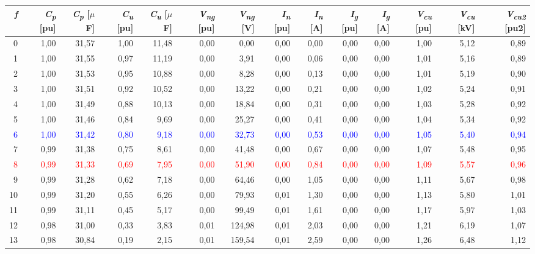 \begin{tabular}{rrrrrrrrrrrrrr}
\toprule
\textit{\textbf{f}} & \textbf{\textit{C\textsubscript{p}} [pu]} & \textbf{\textit{C\textsubscript{p}} [$\mu$F]} & \textbf{\textit{C\textsubscript{u}} [pu]} & \textbf{\textit{C\textsubscript{u}} [$\mu$F]} & \textbf{\textit{V\textsubscript{ng}} [pu]} & \textbf{\textit{V\textsubscript{ng}} [V]} & \textbf{\textit{I\textsubscript{n}} [pu]} & \textbf{\textit{I\textsubscript{n}} [A]} & \textbf{\textit{I\textsubscript{g}} [pu]} & \textbf{\textit{I\textsubscript{g}} [A]} & \textbf{\textit{V\textsubscript{cu}} [pu]} & \textbf{\textit{V\textsubscript{cu}} [kV]} & \textbf{\textit{V\textsubscript{cu2}} [pu2]} \\
\midrule
0 & 1,00 & 31,57 & 1,00 & 11,48 & 0,00 & 0,00 & 0,00 & 0,00 & 0,00 & 0,00 & 1,00 & 5,12 & 0,89 \\
1 & 1,00 & 31,55 & 0,97 & 11,19 & 0,00 & 3,91 & 0,00 & 0,06 & 0,00 & 0,00 & 1,01 & 5,16 & 0,89 \\
2 & 1,00 & 31,53 & 0,95 & 10,88 & 0,00 & 8,28 & 0,00 & 0,13 & 0,00 & 0,00 & 1,01 & 5,19 & 0,90 \\
3 & 1,00 & 31,51 & 0,92 & 10,52 & 0,00 & 13,22 & 0,00 & 0,21 & 0,00 & 0,00 & 1,02 & 5,24 & 0,91 \\
4 & 1,00 & 31,49 & 0,88 & 10,13 & 0,00 & 18,84 & 0,00 & 0,31 & 0,00 & 0,00 & 1,03 & 5,28 & 0,92 \\
5 & 1,00 & 31,46 & 0,84 & 9,69 & 0,00 & 25,27 & 0,00 & 0,41 & 0,00 & 0,00 & 1,04 & 5,34 & 0,92 \\
\textcolor{blue}{6} & \textcolor{blue}{1,00} & \textcolor{blue}{31,42} & \textcolor{blue}{0,80} & \textcolor{blue}{9,18} & \textcolor{blue}{0,00} & \textcolor{blue}{32,73} & \textcolor{blue}{0,00} & \textcolor{blue}{0,53} & \textcolor{blue}{0,00} & \textcolor{blue}{0,00} & \textcolor{blue}{1,05} & \textcolor{blue}{5,40} & \textcolor{blue}{0,94} \\
7 & 0,99 & 31,38 & 0,75 & 8,61 & 0,00 & 41,48 & 0,00 & 0,67 & 0,00 & 0,00 & 1,07 & 5,48 & 0,95 \\
\textcolor{red}{8} & \textcolor{red}{0,99} & \textcolor{red}{31,33} & \textcolor{red}{0,69} & \textcolor{red}{7,95} & \textcolor{red}{0,00} & \textcolor{red}{51,90} & \textcolor{red}{0,00} & \textcolor{red}{0,84} & \textcolor{red}{0,00} & \textcolor{red}{0,00} & \textcolor{red}{1,09} & \textcolor{red}{5,57} & \textcolor{red}{0,96} \\
9 & 0,99 & 31,28 & 0,62 & 7,18 & 0,00 & 64,46 & 0,00 & 1,05 & 0,00 & 0,00 & 1,11 & 5,67 & 0,98 \\
10 & 0,99 & 31,20 & 0,55 & 6,26 & 0,00 & 79,93 & 0,01 & 1,30 & 0,00 & 0,00 & 1,13 & 5,80 & 1,01 \\
11 & 0,99 & 31,11 & 0,45 & 5,17 & 0,00 & 99,49 & 0,01 & 1,61 & 0,00 & 0,00 & 1,17 & 5,97 & 1,03 \\
12 & 0,98 & 31,00 & 0,33 & 3,83 & 0,01 & 124,98 & 0,01 & 2,03 & 0,00 & 0,00 & 1,21 & 6,19 & 1,07 \\
13 & 0,98 & 30,84 & 0,19 & 2,15 & 0,01 & 159,54 & 0,01 & 2,59 & 0,00 & 0,00 & 1,26 & 6,48 & 1,12 \\
\bottomrule
\end{tabular}